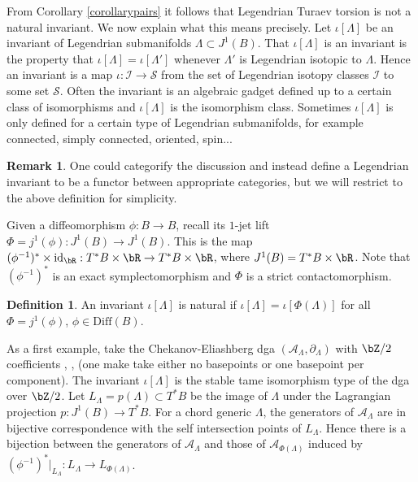 \documentclass[JEP,XML,SOM,Unicode,NoFloatCountersInSection]{cedram}
\let\mathcal\mathscr
\newcommand{\Diff}{\mathrm{Diff}}
\newcommand{\id}{\mathrm{id}}
\theoremstyle{plain}
\theoremstyle{definition}
\newtheorem{definition}[theorem]{Definition}
\newtheorem{remark}[theorem]{Remark}
\newcommand{\cA}{\mathcal{A}}\newcommand{\cB}{\mathcal{B}}
\newcommand{\cI}{\mathcal{I}}\newcommand{\cJ}{\mathcal{J}}
\newcommand{\cS}{\mathcal{S}}\newcommand{\cT}{\mathcal{T}}
\begin{document}
From Corollary \ref{corollarypairs} it follows that Legendrian Turaev torsion is not a natural invariant. We now explain what this means precisely. Let $\iota[\Lambda]$ be an invariant of Legendrian submanifolds $\Lambda \subset J^1(B)$. That $\iota[\Lambda]$ is an invariant is the property that $\iota[\Lambda]=\iota[\Lambda']$ whenever $\Lambda'$ is Legendrian isotopic to $\Lambda$. Hence an invariant is a map $\iota: \cI \to \cS$ from the set of Legendrian isotopy classes $\cI$ to some set $\cS$. Often the invariant is an algebraic gadget defined up to a certain class of isomorphisms and $\iota[\Lambda]$ is the isomorphism class. Sometimes $\iota[\Lambda]$ is only defined for a certain type of Legendrian submanifolds, for example connected, simply connected, oriented, spin...

\begin{remark}
One could categorify the discussion and instead define a Legendrian invariant to be a functor between appropriate categories, but we will restrict to the above definition for simplicity.
\end{remark}

Given a diffeomorphism $\phi:B \to B$, recall its $1$-jet lift $\Phi=j^1(\phi):J^1(B) \to J^1(B)$. This is the map $(\phi^{-1})^* \times \id_{\bR} : T^*B \times \bR \to T^*B \times \bR$, where $J^1(B)=T^*B \times \bR$. Note that $(\phi^{-1})^*$ is an exact symplectomorphism and $\Phi$ is a strict contactomorphism.

\begin{definition}\label{def: naturality}
An invariant $\iota[\Lambda]$ is natural if $\iota[\Lambda]=\iota[\Phi(\Lambda)]$ for all $\Phi=j^1(\phi)$, $\phi \in \Diff(B)$.
\end{definition}

As a first example, take the Chekanov-Eliashberg dga $(\cA_{\Lambda}, \partial_{\Lambda})$ with $\bZ/2$ coefficients \cite{C02}, \cite{E98}, \cite{EES07} (one make take either no basepoints or one basepoint per component). The invariant $\iota[\Lambda]$ is the stable tame isomorphism type of the dga over $\bZ/2$. Let $L_{\Lambda}=p(\Lambda) \subset T^*B$ be the image of $\Lambda$ under the Lagrangian projection $p:J^1(B) \to T^*B$. For a chord generic $\Lambda$, the generators of $\cA_{\Lambda}$ are in bijective correspondence with the self intersection points of $L_{\Lambda}$. Hence there is a bijection between the generators of $\cA_{\Lambda}$ and those of $\cA_{\Phi(\Lambda)}$ induced by $(\phi^{-1})^*|_{L_\Lambda}: L_\Lambda \to L_{\Phi(\Lambda)}$.
\end{document}
